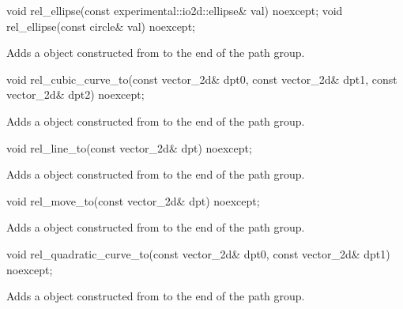 \begin{itemdecl}
void rel_ellipse(const experimental::io2d::ellipse& val) noexcept;
void rel_ellipse(const circle& val) noexcept;
\end{itemdecl}
\begin{itemdescr}
\pnum
\effects
Adds a  object constructed from  to the end of the path group.
\end{itemdescr}


\begin{itemdecl}
void rel_cubic_curve_to(const vector_2d& dpt0, const vector_2d& dpt1,
  const vector_2d& dpt2) noexcept;
\end{itemdecl}
\begin{itemdescr}
\pnum
\effects
Adds a  object constructed from  to the end of the path group.
\end{itemdescr}

\begin{itemdecl}
void rel_line_to(const vector_2d& dpt) noexcept;
\end{itemdecl}
\begin{itemdescr}
\pnum
\effects
Adds a  object constructed from  to the end of the path group.
\end{itemdescr}

\begin{itemdecl}
void rel_move_to(const vector_2d& dpt) noexcept;
\end{itemdecl}
\begin{itemdescr}
\pnum
\effects
Adds a  object constructed from  to the end of the path group.
\end{itemdescr}

\begin{itemdecl}
void rel_quadratic_curve_to(const vector_2d& dpt0, const vector_2d& dpt1)
  noexcept;
\end{itemdecl}
\begin{itemdescr}
\pnum
\effects
Adds a  object constructed from  to the end of the path group.
\end{itemdescr}

